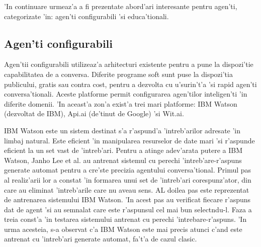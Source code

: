 \documentclass[12pt,a4paper,twoside]{report}
\begin{document}
'In continuare urmeaz'a a fi prezentate abord'ari interesante pentru agen'ti, categorizate 'in: agen'ti configurabili 'si educa'tionali. 






\subsection{Agen'ti configurabili}

Agen'tii configurabili utilizeaz'a arhitecturi existente pentru a pune la dispozi'tie capabilitatea de a conversa. 
Diferite programe soft sunt puse la dispozi'tia publicului, gratis sau contra cost, pentru a dezvolta cu u'surin't'a 'si rapid agen'ti conversa'tionali. Aceste platforme permit configurarea agen'tilor inteligen'ti 'in diferite domenii. 'In aceast'a zon'a exist'a trei mari platforme: IBM Watson (dezvoltat de IBM), Api.ai (de'tinut de Google) 'si Wit.ai. 


IBM Watson este un sistem destinat s'a r'aspund'a 'intreb'arilor adresate 'in limbaj natural. Este eficient 'in manipularea resurselor de date mari 'si r'aspunde eficient la un set vast de 'intreb'ari. Pentru a atinge adev'arata putere a IBM Watson, Janho Lee et al. \cite{LeeTrainingPairs} au antrenat sistemul cu perechi 'intreb'are-r'aspuns generate automat pentru a cre'ste precizia agentului conversa'tional. Primul pas al realiz'arii lor a constat 'in formarea unui set de 'intreb'ari corespunz'ator, din care au eliminat 'intreb'arile care nu aveau sens. AL doilea pas este reprezentat de antrenarea sistemului IBM Watson. 'In acest pas au verificat fiecare r'aspuns dat de agent 'si au semnalat care este r'aspunsul cel mai bun select\ia ndu-l. Faza a treia const'a 'in testarea sistemului antrenat cu perechi 'intrebare-r'aspuns. 'In urma acesteia, s-a observat c'a IBM Watson este mai precis atunci c'and este antrenat cu 'intreb'ari generate automat, fa't'a de cazul clasic.
\end{document}

